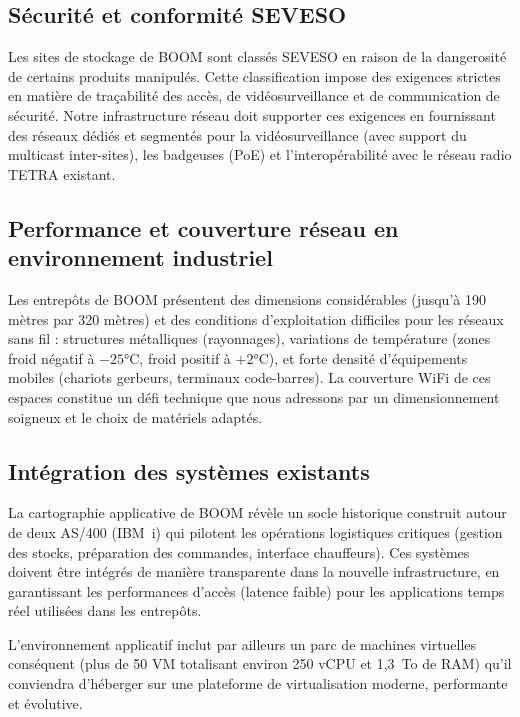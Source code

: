 \documentclass[12pt,a4paper]{report}
\begin{document}
\subsection{Sécurité et conformité SEVESO}

Les sites de stockage de BOOM sont classés SEVESO en raison de la dangerosité de certains produits manipulés. Cette classification impose des exigences strictes en matière de traçabilité des accès, de vidéosurveillance et de communication de sécurité. Notre infrastructure réseau doit supporter ces exigences en fournissant des réseaux dédiés et segmentés pour la vidéosurveillance (avec support du multicast inter-sites), les badgeuses (PoE) et l'interopérabilité avec le réseau radio TETRA existant.

\subsection{Performance et couverture réseau en environnement industriel}

Les entrepôts de BOOM présentent des dimensions considérables (jusqu'à 190 mètres par 320 mètres) et des conditions d'exploitation difficiles pour les réseaux sans fil : structures métalliques (rayonnages), variations de température (zones froid négatif à $-25$°C, froid positif à $+2$°C), et forte densité d'équipements mobiles (chariots gerbeurs, terminaux code-barres). La couverture WiFi de ces espaces constitue un défi technique que nous adressons par un dimensionnement soigneux et le choix de matériels adaptés.

\subsection{Intégration des systèmes existants}

La cartographie applicative de BOOM révèle un socle historique construit autour de deux AS/400 (IBM~i) qui pilotent les opérations logistiques critiques (gestion des stocks, préparation des commandes, interface chauffeurs). Ces systèmes doivent être intégrés de manière transparente dans la nouvelle infrastructure, en garantissant les performances d'accès (latence faible) pour les applications temps réel utilisées dans les entrepôts.

L'environnement applicatif inclut par ailleurs un parc de machines virtuelles conséquent (plus de 50 VM totalisant environ 250 vCPU et 1,3~To de RAM) qu'il conviendra d'héberger sur une plateforme de virtualisation moderne, performante et évolutive.
\end{document}
